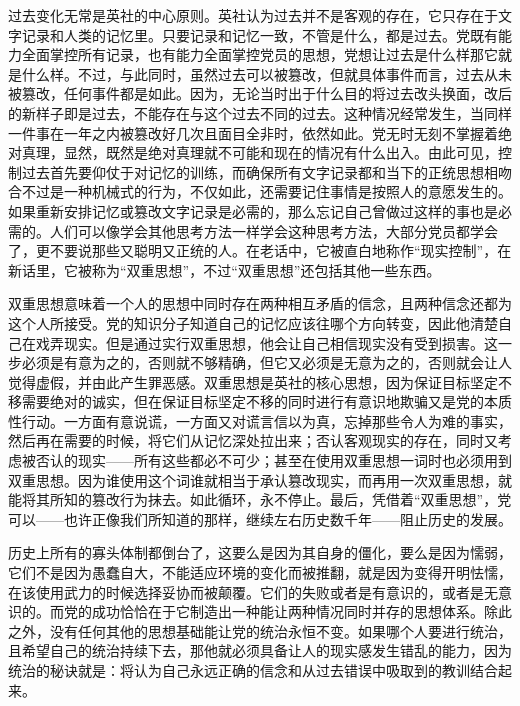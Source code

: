 过去变化无常是英社的中心原则。英社认为过去并不是客观的存在，它只存在于文字记录和人类的记忆里。只要记录和记忆一致，不管是什么，都是过去。党既有能力全面掌控所有记录，也有能力全面掌控党员的思想，党想让过去是什么样那它就是什么样。不过，与此同时，虽然过去可以被篡改，但就具体事件而言，过去从未被篡改，任何事件都是如此。因为，无论当时出于什么目的将过去改头换面，改后的新样子即是过去，不能存在与这个过去不同的过去。这种情况经常发生，当同样一件事在一年之内被篡改好几次且面目全非时，依然如此。党无时无刻不掌握着绝对真理，显然，既然是绝对真理就不可能和现在的情况有什么出入。由此可见，控制过去首先要仰仗于对记忆的训练，而确保所有文字记录都和当下的正统思想相吻合不过是一种机械式的行为，不仅如此，还需要记住事情是按照人的意愿发生的。如果重新安排记忆或篡改文字记录是必需的，那么忘记自己曾做过这样的事也是必需的。人们可以像学会其他思考方法一样学会这种思考方法，大部分党员都学会了，更不要说那些又聪明又正统的人。在老话中，它被直白地称作``现实控制''，在新话里，它被称为``双重思想''，不过``双重思想''还包括其他一些东西。

双重思想意味着一个人的思想中同时存在两种相互矛盾的信念，且两种信念还都为这个人所接受。党的知识分子知道自己的记忆应该往哪个方向转变，因此他清楚自己在戏弄现实。但是通过实行双重思想，他会让自己相信现实没有受到损害。这一步必须是有意为之的，否则就不够精确，但它又必须是无意为之的，否则就会让人觉得虚假，并由此产生罪恶感。双重思想是英社的核心思想，因为保证目标坚定不移需要绝对的诚实，但在保证目标坚定不移的同时进行有意识地欺骗又是党的本质性行动。一方面有意说谎，一方面又对谎言信以为真，忘掉那些令人为难的事实，然后再在需要的时候，将它们从记忆深处拉出来；否认客观现实的存在，同时又考虑被否认的现实------所有这些都必不可少；甚至在使用双重思想一词时也必须用到双重思想。因为谁使用这个词谁就相当于承认篡改现实，而再用一次双重思想，就能将其所知的篡改行为抹去。如此循环，永不停止。最后，凭借着``双重思想''，党可以------也许正像我们所知道的那样，继续左右历史数千年------阻止历史的发展。

历史上所有的寡头体制都倒台了，这要么是因为其自身的僵化，要么是因为懦弱，它们不是因为愚蠢自大，不能适应环境的变化而被推翻，就是因为变得开明怯懦，在该使用武力的时候选择妥协而被颠覆。它们的失败或者是有意识的，或者是无意识的。而党的成功恰恰在于它制造出一种能让两种情况同时并存的思想体系。除此之外，没有任何其他的思想基础能让党的统治永恒不变。如果哪个人要进行统治，且希望自己的统治持续下去，那他就必须具备让人的现实感发生错乱的能力，因为统治的秘诀就是：将认为自己永远正确的信念和从过去错误中吸取到的教训结合起来。

